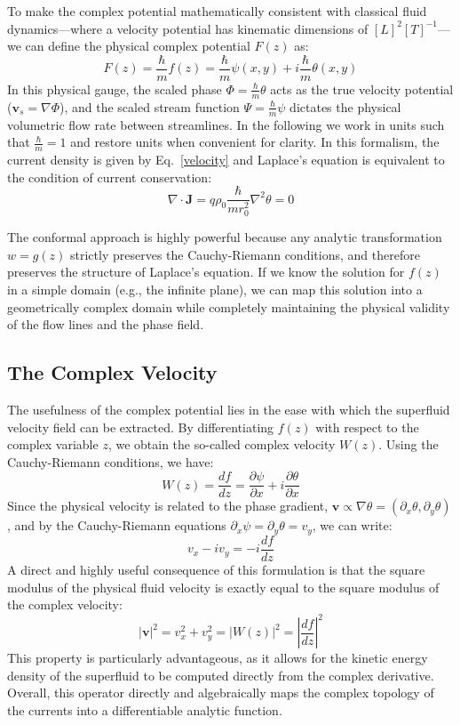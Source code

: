 \documentclass[english,binding=0.6cm,noexaminfo]{sapthesis}
\begin{document}
To make the complex potential mathematically consistent with classical fluid dynamics---where a velocity potential has kinematic dimensions of $[L]^2[T]^{-1}$---we can define the physical complex potential $F(z)$ as:
\begin{equation}
    F(z) = \frac{\hbar}{m} f(z) = \frac{\hbar}{m} \psi(x,y) + i \frac{\hbar}{m} \theta(x,y)
\end{equation}
In this physical gauge, the scaled phase $\Phi = \frac{\hbar}{m}\theta$ acts as the true velocity potential ($\mathbf{v}_s = \nabla \Phi$), and the scaled stream function $\Psi = \frac{\hbar}{m}\psi$ dictates the physical volumetric flow rate between streamlines. 
In the following we work in units such that $\frac{\hbar}{m}=1$ and restore units when convenient for clarity. In this formalism, the current density is given by Eq.~\eqref{velocity} and Laplace's equation is equivalent to the condition of current conservation:
$$
\nabla \cdot \mathbf{J} = q\rho_0\frac{\hbar}{mr^2_0}\nabla^2\theta = 0
$$

The conformal approach is highly powerful because any analytic transformation $w = g(z)$ strictly preserves the Cauchy-Riemann conditions, and therefore preserves the structure of Laplace's equation. If we know the solution for $f(z)$ in a simple domain (e.g., the infinite plane), we can map this solution into a geometrically complex domain while completely maintaining the physical validity of the flow lines and the phase field.

\subsection{The Complex Velocity}
The usefulness of the complex potential lies in the ease with which the superfluid velocity field can be extracted. By differentiating $f(z)$ with respect to the complex variable $z$, we obtain the so-called complex velocity $W(z)$. Using the Cauchy-Riemann conditions, we have:
\begin{equation}
    W(z) = \frac{df}{dz} = \frac{\partial \psi}{\partial x} + i \frac{\partial \theta}{\partial x}
\end{equation}
Since the physical velocity is related to the phase gradient, $\mathbf{v} \propto \nabla \theta = (\partial_x \theta, \partial_y \theta)$, and by the Cauchy-Riemann equations $\partial_x \psi = \partial_y \theta = v_y$, we can write:
\begin{equation}
    v_x - i v_y = -i \frac{df}{dz}
\end{equation}
A direct and highly useful consequence of this formulation is that the square modulus of the physical fluid velocity is exactly equal to the square modulus of the complex velocity:
\begin{equation}
    |\mathbf{v}|^2 = v_x^2 + v_y^2 = |W(z)|^2 = \left| \frac{df}{dz} \right|^2
\end{equation}
This property is particularly advantageous, as it allows for the kinetic energy density of the superfluid to be computed directly from the complex derivative. Overall, this operator directly and algebraically maps the complex topology of the currents into a differentiable analytic function.
\end{document}
